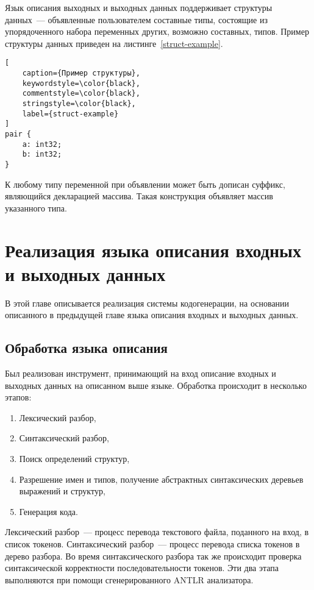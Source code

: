 \documentclass[times,specification,annotation]{style/itmo-student-thesis/itmo-student-thesis}
\begin{document}
Язык описания выходных и выходных данных поддерживает структуры данных~--- объявленные пользователем составные типы, состоящие из упорядоченного набора переменных других, возможно составных, типов. Пример структуры данных приведен на листинге~\ref{struct-example}.

\begin{lstlisting}[
    caption={Пример структуры},
    keywordstyle=\color{black},
    commentstyle=\color{black},
    stringstyle=\color{black},
    label={struct-example}
]
pair {
    a: int32;
    b: int32;
}
\end{lstlisting}

К любому типу переменной при объявлении может быть дописан суффикс, являющийся декларацией массива. Такая конструкция объявляет массив указанного типа.

\chapter{Реализация языка описания входных и выходных данных}

В этой главе описывается реализация системы кодогенерации, на основании описанного в предыдущей главе языка описания входных и выходных данных.

\section{Обработка языка описания}

Был реализован инструмент, принимающий на вход описание входных и выходных данных на описанном выше языке. Обработка происходит в несколько этапов:

\begin{enumerate}
    \item Лексический разбор,
    \item Синтаксический разбор,
    \item Поиск определений структур,
    \item Разрешение имен и типов, получение абстрактных синтаксических деревьев выражений и структур,
    \item Генерация кода.
\end{enumerate}

Лексический разбор~--- процесс перевода текстового файла, поданного на вход, в список токенов. Синтаксический разбор~--- процесс перевода списка токенов в дерево разбора. Во время синтаксического разбора так же происходит проверка синтаксической корректности последовательности токенов. Эти два этапа выполняются при помощи сгенерированного ANTLR анализатора.
\end{document}
